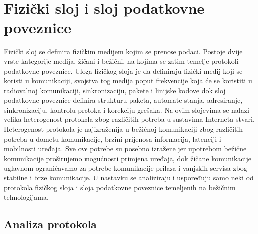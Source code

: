 \documentclass[times, utf8, diplomski]{fer}
\begin{document}
\section{Fizički sloj i sloj podatkovne poveznice}
 Fizički sloj se definira fizičkim medijem kojim se prenose podaci. Postoje dvije vrste kategorije medija, žičani i bežični, na kojima se zatim temelje protokoli podatkovne poveznice. Uloga fizičkog sloja je da definiraju fizički medij koji se koristi u komunikaciji, svojstva tog medija poput frekvencije koja će se koristiti u radiovalnoj komunikaciji, sinkronizaciju, pakete i linijske kodove dok sloj podatkovne poveznice definira strukturu paketa, automate stanja, adresiranje, sinkronizaciju, kontrolu protoka i korekciju grešaka. Na ovim slojevima se nalazi velika heterogenost protokola zbog različitih potreba u sustavima Interneta stvari. Heterogenost protokola je najizraženija u bežičnoj komunikaciji zbog različitih potreba u dometu komunikacije, brzini prijenosa informacija, latenciji i mobilnosti uređaja. Sve ove potrebe su posebno izražene jer upotrebom bežične komunikacije proširujemo mogućnosti primjena uređaja, dok žičane komunikacije uglavnom ograničavamo za potrebe komunikacije prilaza i vanjskih servisa zbog stabilne i brze komunikacije. U nastavku se analiziraju i uspoređuju samo neki od protokola fizičkog sloja i sloja podatkovne poveznice temeljenih na bežičnim tehnologijama.

\subsection{Analiza protokola}
\end{document}
